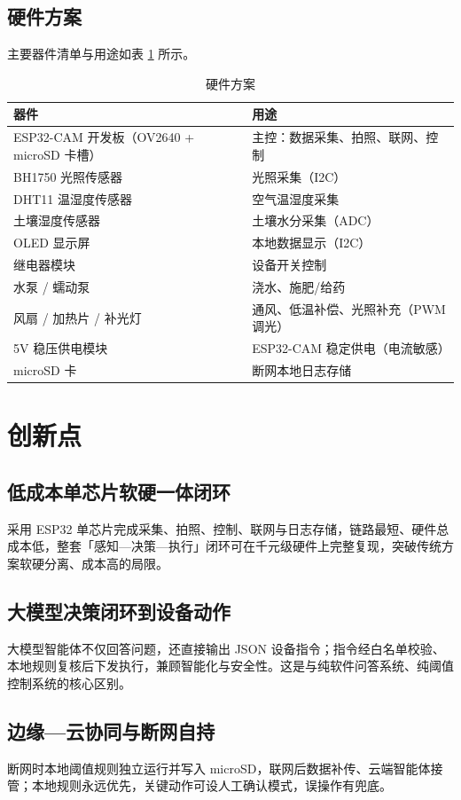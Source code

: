 ﻿\documentclass[11pt]{ctexart}
\begin{document}
\subsection{硬件方案}
主要器件清单与用途如表 \ref{tab:hardware} 所示。
\begin{longtable}{p{6.4cm}p{8.8cm}}
  \caption{硬件方案}\label{tab:hardware}\\
  \toprule
  器件 & 用途 \\
  \midrule
  ESP32-CAM 开发板（OV2640 + microSD 卡槽） & 主控：数据采集、拍照、联网、控制 \\
  BH1750 光照传感器 & 光照采集（I2C） \\
  DHT11 温湿度传感器 & 空气温湿度采集 \\
  土壤湿度传感器 & 土壤水分采集（ADC） \\
  OLED 显示屏 & 本地数据显示（I2C） \\
  继电器模块 & 设备开关控制 \\
  水泵 / 蠕动泵 & 浇水、施肥/给药 \\
  风扇 / 加热片 / 补光灯 & 通风、低温补偿、光照补充（PWM 调光） \\
  5V 稳压供电模块 & ESP32-CAM 稳定供电（电流敏感） \\
  microSD 卡 & 断网本地日志存储 \\
  \bottomrule
\end{longtable}

\section{创新点}
\subsection{低成本单芯片软硬一体闭环}
采用 ESP32 单芯片完成采集、拍照、控制、联网与日志存储，链路最短、硬件总成本低，整套「感知—决策—执行」闭环可在千元级硬件上完整复现，突破传统方案软硬分离、成本高的局限。

\subsection{大模型决策闭环到设备动作}
大模型智能体不仅回答问题，还直接输出 JSON 设备指令；指令经白名单校验、本地规则复核后下发执行，兼顾智能化与安全性。这是与纯软件问答系统、纯阈值控制系统的核心区别。

\subsection{边缘—云协同与断网自持}
断网时本地阈值规则独立运行并写入 microSD，联网后数据补传、云端智能体接管；本地规则永远优先，关键动作可设人工确认模式，误操作有兜底。
\end{document}
